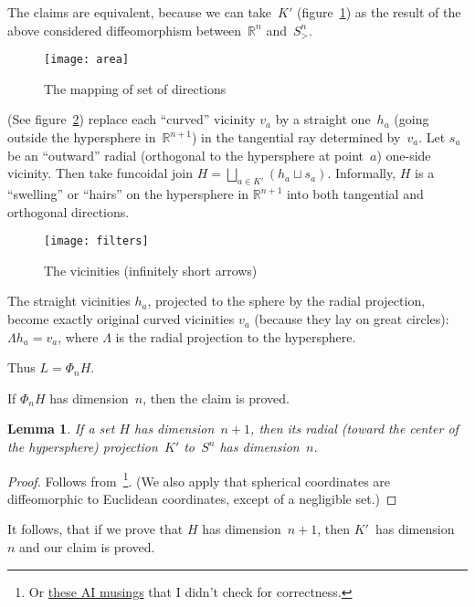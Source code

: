 \documentclass[oneside,draft]{amsart}
\newtheorem{lem}{Lemma}
\begin{document}
The claims are equivalent, because we can take~$K'$ (figure~\ref{fig:area}) as the result of the above considered diffeomorphism between~$\mathbb{R}^n$ and~$S^n_{>}$.

\begin{figure}[hbt]
    \centering
    \texttt{[image: area]}
    \caption{The mapping of set of directions}
    \label{fig:area}
\end{figure}

(See figure~\ref{fig:filters}) replace each ``curved'' vicinity $v_a$ by a straight one~$h_a$ (going outside the hypersphere in~$\mathbb{R}^{n+1}$) in the tangential ray determined by~$v_a$. Let $s_a$ be an ``outward'' radial (orthogonal to the hypersphere at point~$a$) one-si\-de vicinity. Then take funcoidal join $H=\bigsqcup_{a\in K'}(h_a\sqcup s_a)$. Informally, $H$ is a ``swelling'' or ``hairs'' on the hypersphere in $\mathbb{R}^{n+1}$ into both tangential and orthogonal directions.

\begin{figure}[hbt]
    \centering
    \texttt{[image: filters]}
    \caption{The vicinities (infinitely short arrows)}
    \label{fig:filters}
\end{figure}

The straight vicinities $h_a$, projected to the sphere by the radial projection, become exactly original curved vicinities $v_a$ (because they lay on great circles): $\Lambda h_a=v_a$, where $\Lambda$ is the radial projection to the hypersphere.

Thus $L = \Phi_n H$.

If $\Phi_n H$ has dimension~$n$, then the claim is proved.

\begin{lem}
If a set $H$ has dimension~$n+1$, then its radial (toward the center of the hypersphere) projection~$K'$ to~$S^n$ has dimension~$n$.
\end{lem}

\begin{proof}
Follows from~\cite{189275}\footnote{Or \href{https://grok.com/share/bGVnYWN5_2e0aef8b-4309-420f-815c-a09d76ae97c1}{these AI musings}
that I didn't check for correctness.}.
(We also apply that spherical coordinates are diffeomorphic to Euclidean coordinates, except of a negligible set.)
\end{proof}

It follows, that if we prove that $H$ has dimension~$n+1$, then $K'$~has dimension~$n$ and our claim is proved.
\end{document}
